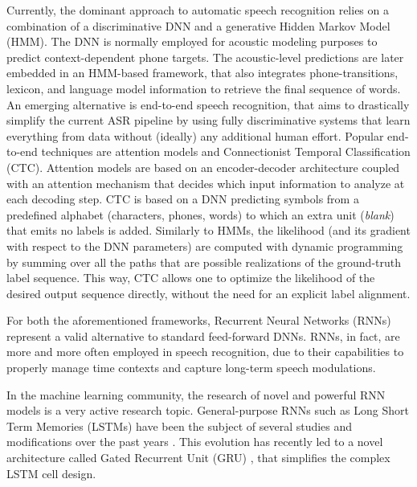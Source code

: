 \documentclass[journal]{IEEEtran}
\begin{document}
Currently, the dominant approach to automatic speech recognition relies on a combination of a discriminative DNN and a generative Hidden Markov Model (HMM). The DNN is normally employed for acoustic modeling purposes to predict context-dependent phone targets. The acoustic-level predictions are later embedded in an HMM-based framework, that also integrates phone-transitions, lexicon, and language model information to retrieve the final sequence of words.
An emerging alternative is end-to-end speech recognition, that aims to drastically simplify the current ASR pipeline by using fully discriminative systems that learn everything from data without (ideally) any additional human effort. Popular end-to-end techniques are attention models and Connectionist Temporal Classification (CTC).
Attention models are based on an encoder-decoder architecture coupled with an attention mechanism \cite{attention1} that decides which input information to analyze at each decoding step.
CTC \cite{CTC_graves} is based on a DNN predicting symbols from a predefined alphabet (characters, phones, words) to which an extra unit (\textit{blank}) that emits no labels is added.
Similarly to HMMs, the likelihood (and its gradient with respect to the DNN parameters) are computed with dynamic programming by summing over all the paths that are possible realizations of the ground-truth label sequence. This way, CTC allows one to optimize the likelihood of the desired output sequence directly, without the need for an explicit label alignment.

For both the aforementioned frameworks, Recurrent Neural Networks (RNNs) represent a valid alternative to standard feed-forward DNNs. RNNs, in fact, are more and more often employed in speech recognition, due to their capabilities to properly manage time contexts and capture long-term speech modulations.

In the machine learning community, the research of novel and powerful RNN models is a very active research topic. General-purpose RNNs such as Long Short Term Memories (LSTMs) \cite{lstm} have been the subject of several studies and modifications over the past years \cite{peephole, lstm_odyssey, lstm_highway}. This evolution has recently led to a novel architecture called Gated Recurrent Unit (GRU) \cite{gru1}, that simplifies the complex LSTM cell design.
\end{document}
